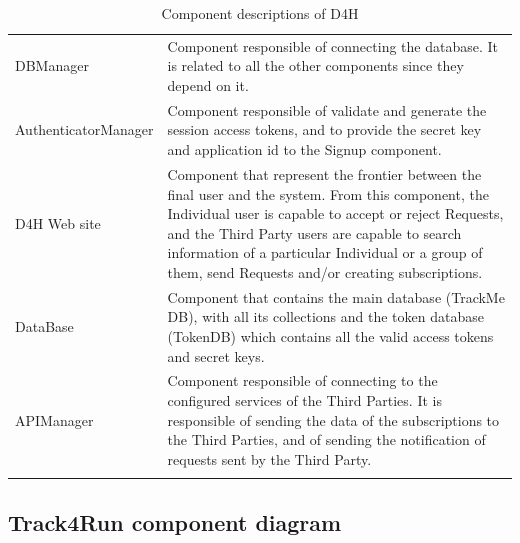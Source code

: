 \documentclass[a4paper, hidelinks, 12pt]{report}
\begin{document}
\begin{longtable}{l p{}}
			DBManager & Component responsible of connecting the database. It is related to all the other components since they depend on it.\\
			
			AuthenticatorManager & Component responsible of validate and generate the session access tokens, and to provide the secret key and application id to the Signup component.\\
			
			D4H Web site & Component that represent the frontier between the final user and the system. From this component, the Individual user is capable to accept or reject Requests, and the Third Party users are capable to search information of a particular Individual or a group of them, send Requests and/or creating subscriptions.\\
			
			DataBase & Component that contains the main database (TrackMe DB), with all its collections and the token database (TokenDB) which contains all the valid access tokens and secret keys.\\
			
			APIManager & Component responsible of connecting to the configured services of the Third Parties. It is responsible of sending the data of the subscriptions to the Third Parties, and of sending the notification of requests sent by the Third Party.\\
			
			\hline
			\caption{Component descriptions of D4H}
			\label{table:d4h_component_descriptions}
		\end{longtable}
			
		\subsection{Track4Run component diagram}
\end{document}
